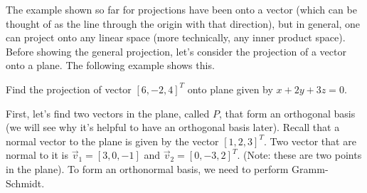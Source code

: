The example shown so far for projections have been onto a vector (which can be thought of as the line through the origin with that direction), but in general, one can project onto any linear space (more technically, any inner product space).  Before showing the general projection, let's consider the projection of a vector onto a plane.  The following example shows this.  




\begin{example}
Find the projection of vector $[6,-2,4]^T$ onto plane given by $x+2y+3z=0$.  
 
 \solution
 
 First, let's find two vectors in the plane, called $P$, that form an orthogonal basis (we will see why it's helpful to have an orthogonal basis later).  Recall that a normal vector to the plane is given by the vector $[1,2,3]^T$.  Two vector that are normal to it is $\vec{v}_1=[3,0,-1]$ and $\vec{v}_2=[0,-3,2]^T$.  (Note: these are two points in the plane).  To form an orthonormal basis, we need to perform Gramm-Schmidt.  
 

\end{example}
